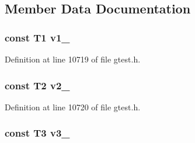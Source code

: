 \subsection{\-Member \-Data \-Documentation}
\hypertarget{classtesting_1_1internal_1_1ValueArray5_aac1d0654cc6c1aceb4a5d0fa7a98042e}{
\subsubsection[{v1\-\_\-}]{\setlength{\rightskip}{0pt plus 5cm}const \-T1 {\bf v1\-\_\-}}}\label{d0/d2e/classtesting_1_1internal_1_1ValueArray5_aac1d0654cc6c1aceb4a5d0fa7a98042e}


\-Definition at line 10719 of file gtest.\-h.

\hypertarget{classtesting_1_1internal_1_1ValueArray5_a9f0a8ce6ce2fd27e980c4c51a7a7256a}{
\subsubsection[{v2\-\_\-}]{\setlength{\rightskip}{0pt plus 5cm}const \-T2 {\bf v2\-\_\-}}}\label{d0/d2e/classtesting_1_1internal_1_1ValueArray5_a9f0a8ce6ce2fd27e980c4c51a7a7256a}


\-Definition at line 10720 of file gtest.\-h.

\hypertarget{classtesting_1_1internal_1_1ValueArray5_a4f8257321a2eab0456239174d6712d5e}{
\subsubsection[{v3\-\_\-}]{\setlength{\rightskip}{0pt plus 5cm}const \-T3 {\bf v3\-\_\-}}}\label{d0/d2e/classtesting_1_1internal_1_1ValueArray5_a4f8257321a2eab0456239174d6712d5e}


